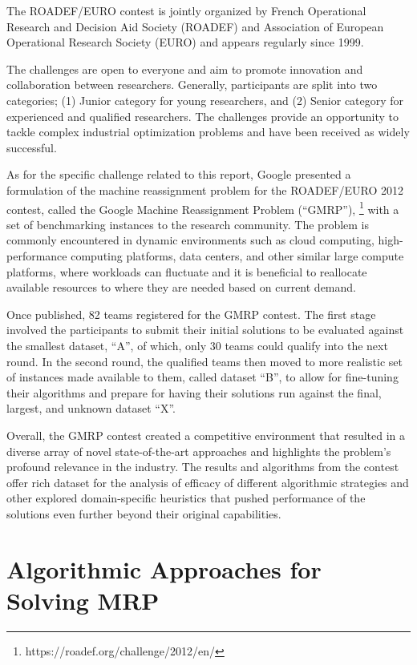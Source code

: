 \documentclass[a4paper,12pt]{Classes/RoboticsLaTeX}
\begin{document}
The ROADEF/EURO contest is jointly organized by French Operational Research and Decision Aid Society (ROADEF) and Association of European Operational Research Society (EURO) and appears regularly since 1999. 

The challenges are open to everyone and aim to promote innovation and
collaboration between researchers. Generally, participants are split
into two categories; (1) Junior category for young researchers, and (2)
Senior category for experienced and qualified researchers. The
challenges provide an opportunity to tackle complex industrial
optimization problems and have been received as widely successful.
\cite{murat2016}

As for the specific challenge related to this report, Google presented a
formulation of the machine reassignment problem for the ROADEF/EURO 2012
contest, called the Google Machine Reassignment Problem (``GMRP''),
\footnote{https://roadef.org/challenge/2012/en/} with a set of
benchmarking instances to the research community. The problem is
commonly encountered in dynamic environments such as cloud computing,
high-performance computing platforms, data centers, and other similar
large compute platforms, where workloads can fluctuate and it is
beneficial to reallocate available resources to where they are needed
based on current demand.

Once published, 82 teams registered for the GMRP contest. The first
stage involved the participants to submit their initial solutions to be
evaluated against the smallest dataset, ``A'', of which, only 30 teams
could qualify into the next round. In the second round, the qualified
teams then moved to more realistic set of instances made available to
them, called dataset ``B'', to allow for fine-tuning their algorithms
and prepare for having their solutions run against the final, largest,
and unknown dataset ``X''.

Overall, the GMRP contest created a competitive environment that
resulted in a diverse array of novel state-of-the-art approaches and
highlights the problem's profound relevance in the industry. The results
and algorithms from the contest offer rich dataset for the analysis of
efficacy of different algorithmic strategies and other explored
domain-specific heuristics that pushed performance of the solutions even
further beyond their original capabilities.

\section{Algorithmic Approaches for Solving MRP}
\end{document}
